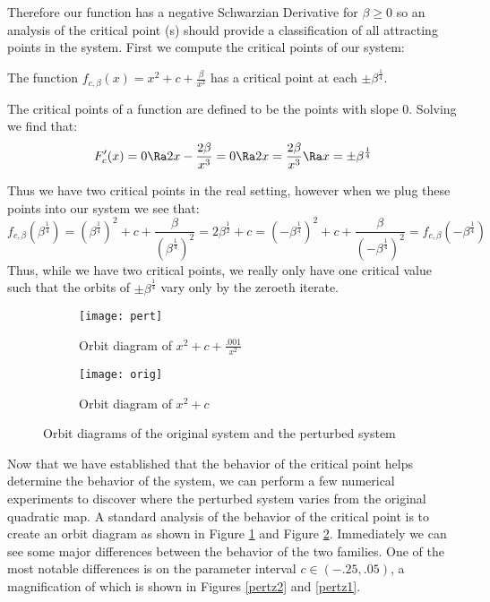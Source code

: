 		Therefore our function has a negative Schwarzian Derivative for $\beta \geq 0$ so an analysis of the critical point (s) should provide a classification of all attracting points in the system. First we compute the critical points of our system:

		\begin{myprop}\label{critp}
			The function $f_{c, \beta} (x) = x^2 + c + \frac{\beta}{x^2}$ has a critical point at each $\pm \beta^{\frac{1}{4}}$.
		\end{myprop}

		\begin{myproof}
			The critical points of a function are defined to be the points with slope 0. Solving we find that:
			\[
			F_c' (x) = 0  \Ra 2x - \frac{2\beta}{x^3} = 0 \Ra 2x = \frac{2\beta}{x^3} \Ra x = \pm\beta^{\frac{1}{4}}
			\]
		\end{myproof}

		Thus we have two critical points in the real setting, however when we plug these points into our system we see that:
		\[
			f_{c, \beta} (\beta^{\frac{1}{4}}) = \left (\beta^{\frac{1}{4}}\right)^2 + c + \frac{\beta}{\left (\beta^{\frac{1}{4}}\right)^2} = 2 \beta^{\frac{1}{2}} + c = \left (-\beta^{\frac{1}{4}}\right)^2 + c + \frac{\beta}{\left (-\beta^{\frac{1}{4}}\right)^2} = f_{c, \beta} (-\beta^{\frac{1}{4}})
		\]
		Thus, while we have two critical points, we really only have one critical value such that the orbits of $\pm \beta^{\frac{1}{4}}$ vary only by the zeroeth iterate.

		\begin{figure}[h]
			\centering
			\begin{subfigure}[b]{0.5\textwidth}
					\texttt{[image: pert]}
					\caption{Orbit diagram of $x^2 + c + \frac{.001}{x^2}$}
					\label{pert}
			\end{subfigure}%
			\begin{subfigure}[b]{0.5\textwidth}
					\texttt{[image: orig]}
					\caption{Orbit diagram of $x^2 + c$}
					\label{stand}%
			\end{subfigure}
			\caption{Orbit diagrams of the original system and the perturbed system}\label{fig:orbits}
		\end{figure}

		Now that we have established that the behavior of the critical point helps determine the behavior of the system, we can perform a few numerical experiments to discover where the perturbed system varies from the original quadratic map. A standard analysis of the behavior of the critical point is to create an orbit diagram as shown in Figure \ref{pert} and Figure \ref{stand}. Immediately we can see some major differences between the behavior of the two families. One of the most notable differences is on the parameter interval $c\in (-.25, .05)$, a magnification of which is shown in Figures \ref{pertz2} and \ref{pertz1}.

